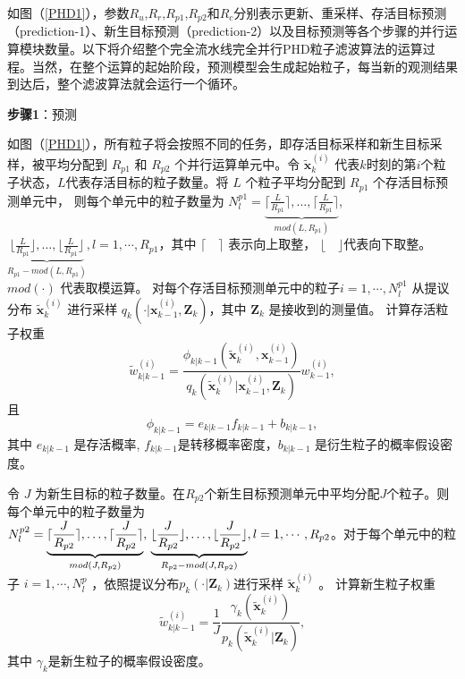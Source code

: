 如图（\ref{PHD1}），参数$R_u$,$R_r$,$R_{p1}$,$R_{p2}$和$R_c$分别表示更新、重采样、存活目标预测（prediction-1）、新生目标预测（prediction-2）以及目标预测等各个步骤的并行运算模块数量。以下将介绍整个完全流水线完全并行PHD粒子滤波算法的运算过程。当然，在整个运算的起始阶段，预测模型会生成起始粒子，每当新的观测结果到达后，整个滤波算法就会运行一个循环。

\textbf{步骤1}：预测

如图（\ref{PHD1}），所有粒子将会按照不同的任务，即存活目标采样和新生目标采样，被平均分配到 $R_{p1}$ 和 $R_{p2}$ 个并行运算单元中。令
$\tilde{\mathbf{x}}_k^{(i)}$ 代表$k$时刻的第$i$个粒子状态，$L$代表存活目标的粒子数量。将 $L$ 个粒子平均分配到 $R_{p1}$ 个存活目标预测单元中， 则每个单元中的粒子数量为 $N_l^{p1} = \underbrace{\lceil\frac{L}{R_{p1}} \rceil,\dots,\lceil\frac{L}{R_{p1}} \rceil}_{mod(L,R_{p1})}$, $\underbrace{\lfloor\frac{L}{R_{p1}} \rfloor,\dots,\lfloor\frac{L}{R_{p1}} \rfloor}_{R_{p1}-mod(L,R_{p1})}, l = 1,\cdots,R_{p1}$，其中 $\lceil\quad\rceil$ 表示向上取整， $\lfloor\quad\rfloor$代表向下取整。$mod(\cdot)$ 代表取模运算。
对每个存活目标预测单元中的粒子$i=1,\cdots,N_l^{p1}$ 从提议分布 $\tilde{\mathbf{x}}_k^{(i)}$ 进行采样
$q_k(\cdot|\mathbf{x}_{k-1}^{(i)},\mathbf{Z}_k)$，其中 $\mathbf{Z}_k$ 是接收到的测量值。
计算存活粒子权重
\begin{equation}\label{Eq:02}
\tilde{w}_{k|k-1}^{(i)}=\frac{\phi_{k|k-1}(\tilde{\mathbf{x}}_k^{(i)},\mathbf{x}_{k-1}^{(i)})}{q_k(\tilde{\mathbf{x}}_k^{(i)}|\mathbf{x}_{k-1}^{(i)},\mathbf{Z}_k)}w_{k-1}^{(i)},
\end{equation}
且
\begin{equation}
\phi_{k|k-1}=e_{k|k-1}f_{k|k-1}+b_{k|k-1},
\end{equation}
其中 $e_{k|k-1}$ 是存活概率, $f_{k|k-1}$是转移概率密度，$b_{k|k-1}$ 是衍生粒子的概率假设密度。

令 $J$ 为新生目标的粒子数量。在$R_{p2}$个新生目标预测单元中平均分配$J$个粒子。则每个单元中的粒子数量为 $N_l^{p2} = \underbrace{\lceil\frac{J}{R_{p2}} \rceil,\dots,\lceil\frac{J}{R_{p2}} \rceil}_{mod(J,R_{p2})},\\ \underbrace{\lfloor\frac{J}{R_{p2}} \rfloor,\dots,\lfloor\frac{J}{R_{p2}} \rfloor}_{R_{p2}-mod(J,R_{p2})}, l = 1,\cdots,R_{p2}$。对于每个单元中的粒子 $i=1,\cdots,N_l^{p}$ ，依照提议分布$
p_k(\cdot|\mathbf{Z}_k)$进行采样 $\tilde{\mathbf{x}}_k^{(i)}$ 。
计算新生粒子权重
\begin{equation}\label{Eq:03}
\tilde{w}_{k|k-1}^{(i)}=\frac{1}{J}\frac{\gamma_k(\tilde{\mathbf{x}}_k^{(i)})}{p_k(\tilde{\mathbf{x}}_k^{(i)}|\mathbf{Z}_k)},
\end{equation}
其中 $\gamma_k$是新生粒子的概率假设密度。

